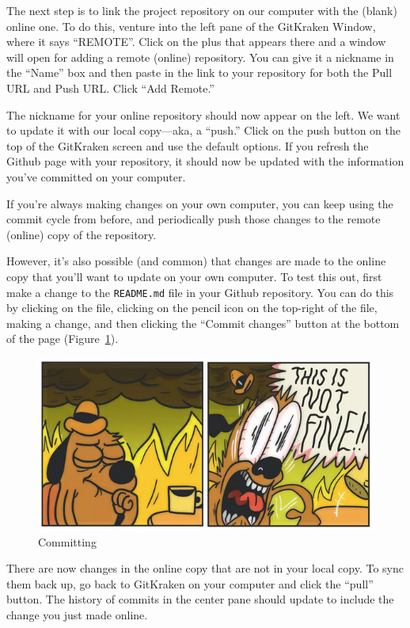 \documentclass[]{Nemilov}
\begin{document}
The next step is to link the project repository on our computer with the (blank) online one.
To do this, venture into the left pane of the GitKraken Window, where it says
``REMOTE''. Click on the plus that appears there and a window will open for
adding a remote (online) repository. You can give it a nickname in the
``Name'' box and then paste in the link to your repository for both the Pull URL
and Push URL. Click ``Add Remote.''

The nickname for your online repository should now appear on the left. We
want to update it with our local copy---aka, a ``push.'' Click on the push
button on the top of the GitKraken screen and use the default options. If you
refresh the Github page with your repository, it should now be updated with the
information you've committed on your computer.

If you're always making changes on your own computer, you can keep using
the commit cycle from before, and periodically push those changes to the remote
(online) copy of the repository.

However, it's also possible (and common) that changes are made to the online
copy that you'll want to update on your own computer. To test this out, first
make a change to the \texttt{README.md} file in your Github repository. You can do this
by clicking on the file, clicking on the pencil icon on the top-right of the
file, making a change, and then clicking the ``Commit changes'' button at the
bottom of the page (Figure~\ref{fig:py-version-control-commit}).

\begin{figure}
\centering
\includegraphics{figures/FIXME.png}
\caption{\label{fig:py-version-control-commit}Committing}
\end{figure}

There are now changes in the online copy that are not in your local
copy. To sync them back up, go back to GitKraken on your computer and
click the ``pull'' button. The history of commits in the center pane should update
to include the change you just made online.
\end{document}
